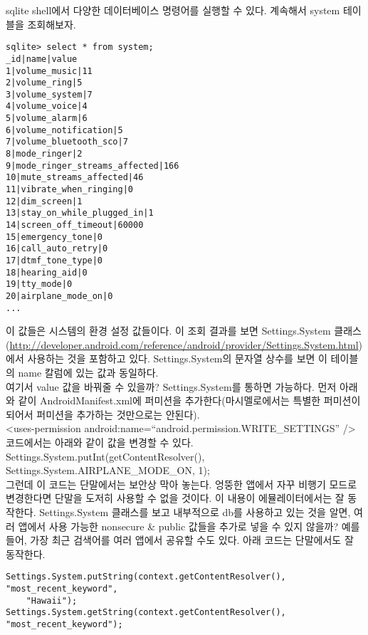 sqlite shell에서 다양한 데이터베이스 명령어를 실행할 수 있다. 계속해서 system 테이블을 조회해보자.
\begin{lstlisting}[frame=single] 
sqlite> select * from system;
_id|name|value
1|volume_music|11
2|volume_ring|5
3|volume_system|7
4|volume_voice|4
5|volume_alarm|6
6|volume_notification|5
7|volume_bluetooth_sco|7
8|mode_ringer|2
9|mode_ringer_streams_affected|166
10|mute_streams_affected|46
11|vibrate_when_ringing|0
12|dim_screen|1
13|stay_on_while_plugged_in|1
14|screen_off_timeout|60000
15|emergency_tone|0
16|call_auto_retry|0
17|dtmf_tone_type|0
18|hearing_aid|0
19|tty_mode|0
20|airplane_mode_on|0
...
\end{lstlisting}
이 값들은 시스템의 환경 설정 값들이다. 이 조회 결과를 보면 Settings.System 클래스(\url{http://developer.android.com/reference/android/provider/Settings.System.html})에서 사용하는 것을 포함하고 있다. Settings.System의 문자열 상수를 보면 이 테이블의 name 칼럼에 있는 값과 동일하다.\\

여기서 value 값을 바꿔줄 수 있을까? Settings.System를 통하면 가능하다.
먼저 아래와 같이 AndroidManifest.xml에 퍼미션을 추가한다(마시멜로에서는 특별한 퍼미션이 되어서 퍼미션을 추가하는 것만으로는 안된다).\\

<uses-permission android:name=``android.permission.WRITE\_SETTINGS'' />\\

코드에서는 아래와 같이 값을 변경할 수 있다.\\

Settings.System.putInt(getContentResolver(), Settings.System.AIRPLANE\_MODE\_ON, 1);\\

그런데 이 코드는 단말에서는 보안상 막아 놓는다. 엉뚱한 앱에서 자꾸 비행기 모드로 변경한다면 단말을 도저히 사용할 수 없을 것이다.
이 내용이 에뮬레이터에서는 잘 동작한다.
Settings.System 클래스를 보고 내부적으로 db를 사용하고 있는 것을 알면, 여러 앱에서 사용 가능한 nonsecure \& public 값들을 추가로 넣을 수 있지 않을까? 예를 들어, 가장 최근 검색어를 여러 앱에서 공유할 수도 있다.
아래 코드는 단말에서도 잘 동작한다. \\
\begin{lstlisting}[frame=single]
Settings.System.putString(context.getContentResolver(), "most_recent_keyword",
	"Hawaii");
Settings.System.getString(context.getContentResolver(), "most_recent_keyword");
\end{lstlisting}


